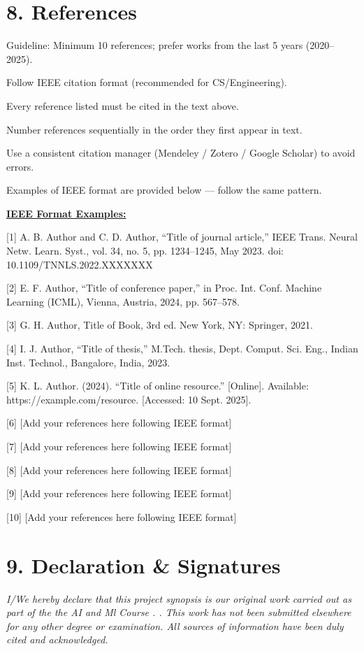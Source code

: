 \documentclass[12pt,a4paper]{article}
\newcommand{\purpsec}[1]{\section*{\color{purp}#1}}
\newcommand{\dredrule}{\noindent{\color{dred}\rule{\linewidth}{0.5pt}}\par\vspace{4pt}}
\begin{document}
\purpsec{8. References}
\dredrule
\begin{guide}{Guideline:}
Minimum 10 references; prefer works from the last 5 years (2020--2025).\par
Follow IEEE citation format (recommended for CS/Engineering).\par
Every reference listed must be cited in the text above.\par
Number references sequentially in the order they first appear in text.\par
Use a consistent citation manager (Mendeley / Zotero / Google Scholar) to avoid errors.\par
Examples of IEEE format are provided below --- follow the same pattern.
\end{guide}

\begingroup\raggedright\sloppy
\underline{\textbf{IEEE Format Examples:}}

[1] A. B. Author and C. D. Author, ``Title of journal article,'' IEEE Trans. Neural Netw. Learn. Syst., vol. 34, no. 5, pp. 1234--1245, May 2023. doi: 10.1109/TNNLS.2022.XXXXXXX

[2] E. F. Author, ``Title of conference paper,'' in Proc. Int. Conf. Machine Learning (ICML), Vienna, Austria, 2024, pp. 567--578.

[3] G. H. Author, Title of Book, 3rd ed. New York, NY: Springer, 2021.

[4] I. J. Author, ``Title of thesis,'' M.Tech. thesis, Dept. Comput. Sci. Eng., Indian Inst. Technol., Bangalore, India, 2023.

[5] K. L. Author. (2024). ``Title of online resource.'' [Online]. Available: https://example.com/resource. [Accessed: 10 Sept. 2025].

\vspace{2pt}
[6] [Add your references here following IEEE format]

[7] [Add your references here following IEEE format]

[8] [Add your references here following IEEE format]

[9] [Add your references here following IEEE format]

[10] [Add your references here following IEEE format]
\endgroup

\purpsec{9. Declaration \& Signatures}
\dredrule
{\itshape I/We hereby declare that this project synopsis is our original work carried out as part of the the AI and Ml Course . . This work has not been submitted elsewhere for any other degree or examination. All sources of information have been duly cited and acknowledged.}
\end{document}
